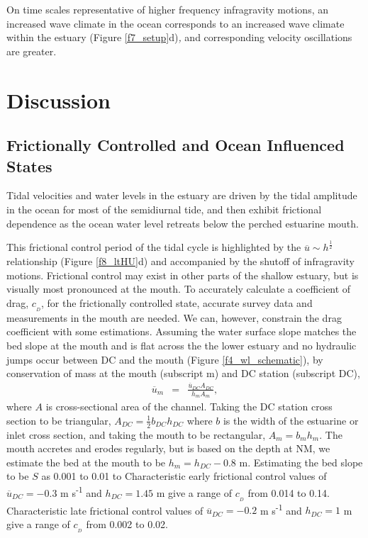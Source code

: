 On time scales representative of higher frequency infragravity motions,
an increased wave climate in the ocean corresponds to an increased
wave climate within the estuary (Figure \ref{f7_setup}d)\emph{, }and corresponding velocity oscillations are greater.





\section{Discussion}


\subsection{Frictionally Controlled and Ocean Influenced States\label{sub:disc_FC_tides}}

Tidal velocities and water levels in the estuary are driven by the
tidal amplitude in the ocean for most of the semidiurnal tide, and
then exhibit frictional dependence as the ocean water level retreats
below the perched estuarine mouth. 

This frictional control period of the tidal cycle is highlighted by
the $\overline{u}\sim h^{\frac{1}{2}}$ relationship (Figure \ref{f8_ltHU}d)
and accompanied by the shutoff of infragravity motions. Frictional
control may exist in other parts of the shallow estuary, but is visually
most pronounced at the mouth. To accurately calculate a coefficient
of drag, $c_{_D}$, for the frictionally controlled state, accurate
survey data and measurements in the mouth are needed. We can, however,
constrain the drag coefficient with some estimations. Assuming the
water surface slope matches the bed slope at the mouth and is flat
across the the lower estuary and no hydraulic jumps occur between
DC and the mouth (Figure \ref{f4_wl_schematic}), by conservation
of mass at the mouth (subscript m) and DC station (subscript DC),
\begin{eqnarray}
\overline{u}_{m} & = & \frac{\overline{u}_{DC}A_{DC}}{h_{m}A_{m}},\label{eq:consmass_udc_um}
\end{eqnarray}
where $A\mbox{}$ is cross-sectional area of the channel. Taking the
DC station cross section to be triangular, $A_{DC}=\frac{1}{2}b_{DC}h_{DC}$
where \textbf{$b\mbox{}$} is the width of the estuarine or inlet
cross section, and taking the mouth to be rectangular, $A_{m}=b_{m}h_{m}$.\emph{
}The mouth accretes and erodes regularly, but is based on the depth
at NM, we estimate the bed at the mouth to be $h_{m}=h_{DC}-0.8$
m. Estimating the bed slope to be $S$ as 0.001 to 0.01 to Characteristic
early frictional control values of $\overline{{u}}{}_{DC}=-0.3$ m
s\textsuperscript{-1} and $h_{DC}=1.45$ m give a range of $c_{_D}$
from 0.014 to 0.14. Characteristic late frictional control values
of $\overline{{u}}{}_{DC}=-0.2$ m s\textsuperscript{-1} and $h_{DC}=1$
m give a range of $c_{_D}$ from 0.002 to 0.02.

